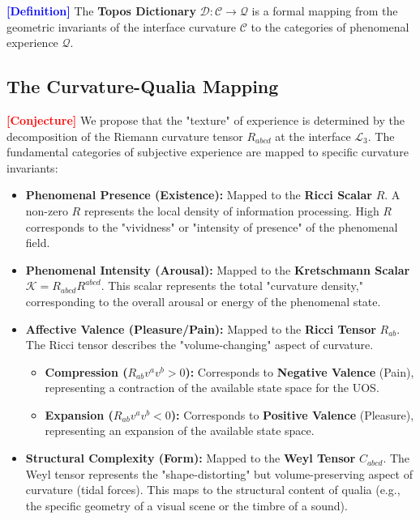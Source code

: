 \documentclass[11pt,titlepage]{article}
\newcommand{\interface}{\mathcal{L}_3}
\newcommand{\curvature}{\mathcal{C}}
\newcommand{\tagdef}{\textcolor{blue}{\textbf{[Definition]}} }
\newcommand{\tagconj}{\textcolor{red}{\textbf{[Conjecture]}} }
\begin{document}
\label{sec:topos_dictionary}
\tagdef The \textbf{Topos Dictionary} $\mathcal{D}: \curvature \to \mathcal{Q}$ is a formal mapping from the geometric invariants of the interface curvature $\curvature$ to the categories of phenomenal experience $\mathcal{Q}$.

\subsection{The Curvature-Qualia Mapping}
\tagconj We propose that the "texture" of experience is determined by the decomposition of the Riemann curvature tensor $R_{abcd}$ at the interface $\interface$. The fundamental categories of subjective experience are mapped to specific curvature invariants:

\begin{itemize}
    
\item \textbf{Phenomenal Presence (Existence):} Mapped to the \textbf{Ricci Scalar} $R$. A non-zero $R$ represents the local density of information processing. High $R$ corresponds to the "vividness" or "intensity of presence" of the phenomenal field.
    
    
\item \textbf{Phenomenal Intensity (Arousal):} Mapped to the \textbf{Kretschmann Scalar} $\mathcal{K} = R_{abcd}R^{abcd}$. This scalar represents the total "curvature density," corresponding to the overall arousal or energy of the phenomenal state.
    
    
\item \textbf{Affective Valence (Pleasure/Pain):} Mapped to the \textbf{Ricci Tensor} $R_{ab}$. The Ricci tensor describes the "volume-changing" aspect of curvature.
    \begin{itemize}
        
\item \textbf{Compression ($R_{ab} v^a v^b > 0$):} Corresponds to \textbf{Negative Valence} (Pain), representing a contraction of the available state space for the UOS.
        
\item \textbf{Expansion ($R_{ab} v^a v^b < 0$):} Corresponds to \textbf{Positive Valence} (Pleasure), representing an expansion of the available state space.
    \end{itemize}
    
    
\item \textbf{Structural Complexity (Form):} Mapped to the \textbf{Weyl Tensor} $C_{abcd}$. The Weyl tensor represents the "shape-distorting" but volume-preserving aspect of curvature (tidal forces). This maps to the structural content of qualia (e.g., the specific geometry of a visual scene or the timbre of a sound).
\end{itemize}
\end{document}
